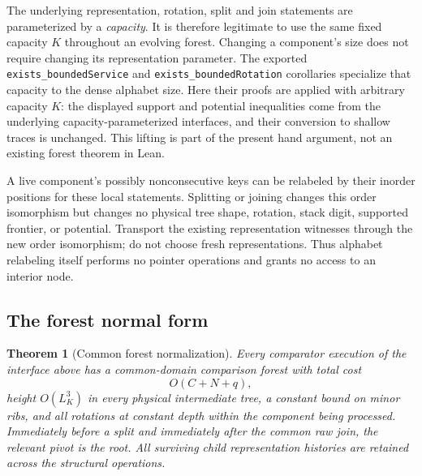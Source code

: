 \documentclass[11pt]{article}
\numberwithin{equation}{section}
\newtheorem{theorem}{Theorem}[section]
\begin{document}
The underlying representation, rotation, split and join statements are
parameterized by a \emph{capacity}. It is therefore legitimate to use the
same fixed capacity $K$ throughout an evolving forest. Changing a
component's size does not require changing its representation parameter.
The exported \texttt{exists\_boundedService} and
\texttt{exists\_boundedRotation} corollaries specialize that capacity to
the dense alphabet size. Here their proofs are applied with arbitrary
capacity $K$: the displayed support and potential inequalities come from
the underlying capacity-parameterized interfaces, and their conversion
to shallow traces is unchanged. This lifting is part of the present
hand argument, not an existing forest theorem in Lean.

A live component's possibly nonconsecutive keys can be relabeled by
their inorder positions for these local statements. Splitting or joining
changes this order isomorphism but changes no physical tree shape,
rotation, stack digit, supported frontier, or potential. Transport the
existing representation witnesses through the new order isomorphism;
do not choose fresh representations. Thus alphabet relabeling itself
performs no pointer operations and grants no access to an interior node.

\subsection{The forest normal form}

\begin{theorem}[Common forest normalization]\label{forest:thm:normal}
Every comparator execution of the interface above has a common-domain
comparison forest with total cost
\[
 O(C+N+q),
\]
height $O(L_K^3)$ in every physical intermediate tree, a constant bound
on minor ribs, and all rotations at constant depth within the component
being processed. Immediately before a split and immediately after the
common raw join, the relevant pivot is the root. All surviving child
representation histories are retained across the structural operations.
\end{theorem}
\end{document}
